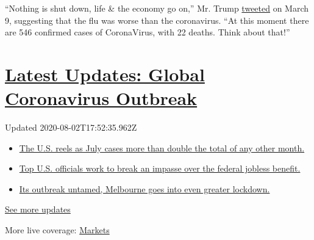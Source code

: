 ``Nothing is shut down, life \& the economy go on,'' Mr. Trump
\href{https://twitter.com/realDonaldTrump/status/1237027356314869761}{tweeted}
on March 9, suggesting that the flu was worse than the coronavirus. ``At
this moment there are 546 confirmed cases of CoronaVirus, with 22
deaths. Think about that!''

\hypertarget{latest-updates-global-coronavirus-outbreak}{%
\section{\texorpdfstring{\href{https://www.nytimes.com/2020/08/01/world/coronavirus-covid-19.html?action=click\&pgtype=Article\&state=default\&region=MAIN_CONTENT_1\&context=storylines_live_updates}{Latest
Updates: Global Coronavirus
Outbreak}}{Latest Updates: Global Coronavirus Outbreak}}\label{latest-updates-global-coronavirus-outbreak}}

Updated 2020-08-02T17:52:35.962Z

\begin{itemize}
\tightlist
\item
  \href{https://www.nytimes.com/2020/08/01/world/coronavirus-covid-19.html?action=click\&pgtype=Article\&state=default\&region=MAIN_CONTENT_1\&context=storylines_live_updates\#link-34047410}{The
  U.S. reels as July cases more than double the total of any other
  month.}
\item
  \href{https://www.nytimes.com/2020/08/01/world/coronavirus-covid-19.html?action=click\&pgtype=Article\&state=default\&region=MAIN_CONTENT_1\&context=storylines_live_updates\#link-780ec966}{Top
  U.S. officials work to break an impasse over the federal jobless
  benefit.}
\item
  \href{https://www.nytimes.com/2020/08/01/world/coronavirus-covid-19.html?action=click\&pgtype=Article\&state=default\&region=MAIN_CONTENT_1\&context=storylines_live_updates\#link-2bc8948}{Its
  outbreak untamed, Melbourne goes into even greater lockdown.}
\end{itemize}

\href{https://www.nytimes.com/2020/08/01/world/coronavirus-covid-19.html?action=click\&pgtype=Article\&state=default\&region=MAIN_CONTENT_1\&context=storylines_live_updates}{See
more updates}

More live coverage:
\href{https://www.nytimes.com/live/2020/07/31/business/stock-market-today-coronavirus?action=click\&pgtype=Article\&state=default\&region=MAIN_CONTENT_1\&context=storylines_live_updates}{Markets}

